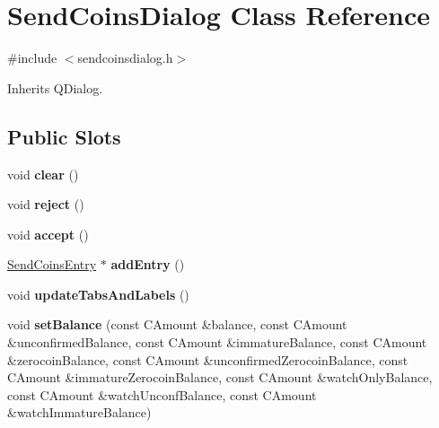 \hypertarget{class_send_coins_dialog}{}\section{Send\+Coins\+Dialog Class Reference}
\label{class_send_coins_dialog}


{\ttfamily \#include $<$sendcoinsdialog.\+h$>$}



Inherits Q\+Dialog.

\subsection*{Public Slots}
\begin{DoxyCompactItemize}
\item 
\mbox{\label{class_send_coins_dialog_a127bddff45f49ff5e6e263efe218ae26}} 
void {\bfseries clear} ()
\item 
\mbox{\label{class_send_coins_dialog_a4879553d77d29f522ac92ac04580f4ad}} 
void {\bfseries reject} ()
\item 
\mbox{\label{class_send_coins_dialog_af2185c3d29e43d37c30669f0def46060}} 
void {\bfseries accept} ()
\item 
\mbox{\label{class_send_coins_dialog_a3d680a76b967641115c6ff2fa83fb62a}} 
\mbox{\hyperlink{class_send_coins_entry}{Send\+Coins\+Entry}} $\ast$ {\bfseries add\+Entry} ()
\item 
\mbox{\label{class_send_coins_dialog_a3b834c739f7d02d8086a2bf58525c5f0}} 
void {\bfseries update\+Tabs\+And\+Labels} ()
\item 
\mbox{\label{class_send_coins_dialog_a5f778ec12cec433369144077d660a53d}} 
void {\bfseries set\+Balance} (const C\+Amount \&balance, const C\+Amount \&unconfirmed\+Balance, const C\+Amount \&immature\+Balance, const C\+Amount \&zerocoin\+Balance, const C\+Amount \&unconfirmed\+Zerocoin\+Balance, const C\+Amount \&immature\+Zerocoin\+Balance, const C\+Amount \&watch\+Only\+Balance, const C\+Amount \&watch\+Unconf\+Balance, const C\+Amount \&watch\+Immature\+Balance)
\end{DoxyCompactItemize}
